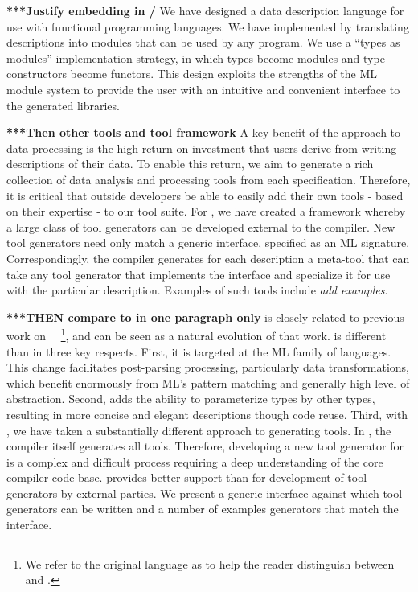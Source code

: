 
\textbf{***Justify embedding in \ocaml{}/\ml{}}
We have designed a data description language for use with
functional programming languages. 
We have implemented \padsml{} by translating descriptions into
  \ocaml{} modules that can be used by any \ocaml{} program. We use a
  ``types as modules'' implementation strategy, in which
  \padsml{} types become modules and \padsml{} type constructors
  become functors. This design exploits the strengths of the ML module
  system to provide the user with an intuitive and convenient
  interface to the generated libraries.

\textbf{***Then other tools and tool framework}
A key benefit of the \pads{} approach to data processing is the
high return-on-investment that users derive from writing 
descriptions of their data. To enable this return, we aim to generate
a rich collection of data analysis and processing tools from each
specification. Therefore, it is critical that outside
developers be able to easily add their own tools - based on their
expertise - to our tool suite.  For \padsml{}, we have created
a framework whereby a large class of tool
generators can be developed external to the compiler.  New tool
generators need only match a generic interface, specified as an ML
signature.  Correspondingly, the compiler generates for each
description a meta-tool that can take any tool generator that
implements the interface and specialize it for use with the particular
description.  Examples of such tools include {\em add examples}.

\textbf{***THEN compare to \padsc{} in one paragraph only}
\padsml{} is closely related to previous work on
\padsc{}~\cite{fisher+:pads}~\footnote{We refer to the original \pads{}
  language as \padsc{} to help the reader distinguish between \padsc{}
  and \padsml{}.}, and can be seen as a natural evolution of that
work.  \padsml{} is different than \padsc{} in three key respects.
First, it is targeted at the ML family of languages. 
This change facilitates post-parsing processing, particularly data
transformations, which benefit enormously from ML's pattern matching
and generally high level of abstraction. 
Second, \padsml{}
adds the ability to parameterize types by other types, resulting in
more concise and elegant descriptions though code reuse. Third, with
\padsml{}, we have taken a substantially different approach to
generating tools. In \padsc{}, the compiler itself generates all
tools.  Therefore,
developing a new tool generator for \padsc{} is a complex and
difficult process requiring a deep understanding of the core compiler
code base.
\padsml{} provides better support than \padsc{} for development of tool
  generators by external parties. We present a generic interface
  against which tool generators can be written and a number of
  examples generators that match the interface.


